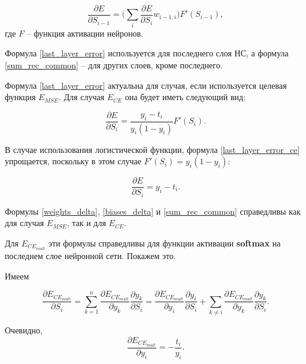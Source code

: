 \begin{equation}
	\label{sum_rec_common}
	\frac{\partial E}{\partial S_{i-1}} = \Bigg(\sum_{i}\frac{\partial E}{\partial S_i}w_{i-1, i}\Bigg)F'(S_{i-1}),
\end{equation}
где $F$ -- функция активации нейронов.

Формула \ref{last_layer_error} используется для последнего слоя НС, а формула \ref{sum_rec_common} -- для других слоев, кроме последнего.

Формула \ref{last_layer_error} актуальна для случая, если используется целевая функция $E_{MSE}$. Для случая $E_{CE}$ она будет иметь следующий вид:

\begin{equation}
	\label{last_layer_error_ce}
	\frac{\partial E}{\partial S_i} = \frac{y_i - t_i}{y_i(1-y_i)}F'(S_i).
\end{equation}

В случае использования логистической функции, формула \ref{last_layer_error_ce} упрощается, поскольку в этом случае $F'(S_i)=y_i(1-y_i)$:

\begin{equation}
	\frac{\partial E}{\partial S_i} = y_i - t_i.
\end{equation}

Формулы \ref{weights_delta}, \ref{biases_delta} и \ref{sum_rec_common} справедливы как для случая $E_{MSE}$, так и для $E_{CE}$.

Для $E_{CE_{mult}}$ эти формулы справедливы для функции активации \textbf{softmax} на последнем слое нейронной сети. Покажем это.

Имеем

\begin{equation}
	\label{common_E}
	\frac{\partial E_{CE_{mult}}}{\partial S_i} = \sum_{k=1}^{n} \frac{\partial E_{CE_{mult}}}{\partial y_k}\frac{\partial y_k}{\partial S_i} = \frac{\partial E_{CE_{mult}}}{\partial y_i}\frac{\partial y_i}{\partial S_i} + \sum_{k\neq i}\frac{\partial E_{CE_{mult}}}{\partial y_k}\frac{\partial y_k}{\partial S_i}.
\end{equation}

Очевидно, 
\begin{equation}
\label{part_deriv_y}
\frac{\partial E_{CE_{mult}}}{\partial y_i} = -\frac{t_i}{y_i}.
\end{equation}

